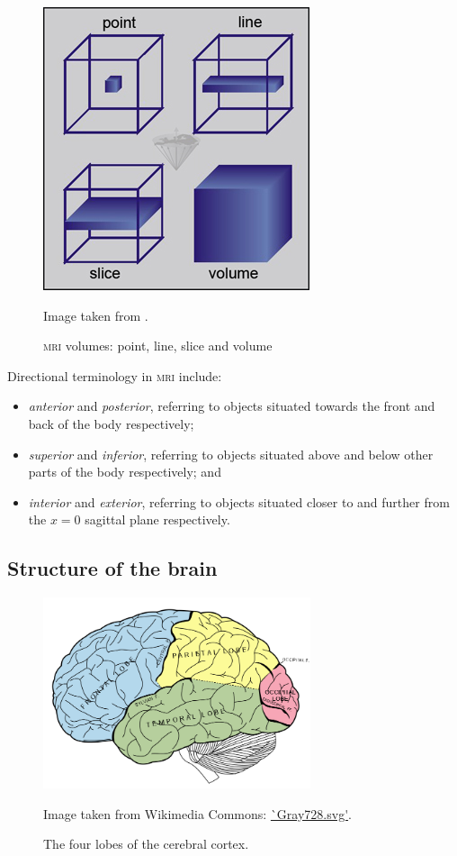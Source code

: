 \begin{figure}[ht]
	\centering
	\includegraphics[scale=0.6]{Images/2_mri_volumes.jpg}
	\caption{\textsc{mri} volumes: point, line, slice and volume}
	\small Image taken from \cite{Rinck2013}.
	\label{svd-term-fig}
\end{figure}

Directional terminology in \textsc{mri} include:
\begin{itemize}
	\item \textit{anterior} and \textit{posterior}, referring to objects situated towards the front and back of the body respectively;
	\item \textit{superior} and \textit{inferior}, referring to objects situated above and below other parts of the body respectively; and
	\item \textit{interior} and \textit{exterior}, referring to objects situated closer to and further from the $x=0$ sagittal plane respectively.
\end{itemize}

\subsection*{Structure of the brain}\label{svd-brain}

\begin{figure}[ht]
	\centering
	\includegraphics[width=0.7\textwidth]{Images/2_Lobes_of_the_brain_NL.png}
	\caption{The four lobes of the cerebral cortex.}
	\small Image taken from Wikimedia Commons: \url{`Gray728.svg'}.
	\label{svd-cerebrumfig}
\end{figure}

